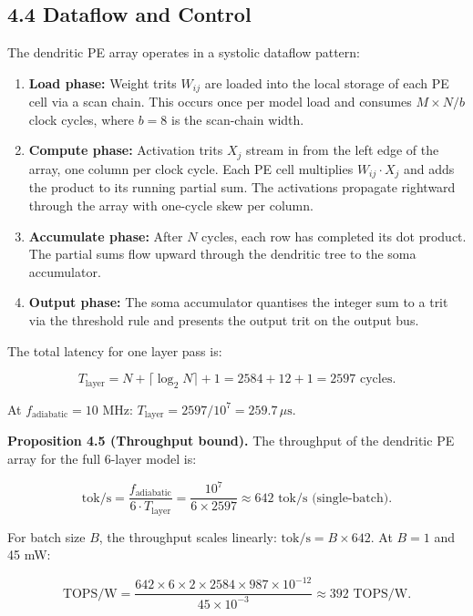 \subsection{4.4 Dataflow and Control}

The dendritic PE array operates in a systolic dataflow pattern:

\begin{enumerate}
\item \textbf{Load phase:} Weight trits \(W_{ij}\) are loaded into
  the local storage of each PE cell via a scan chain. This occurs once
  per model load and consumes \(M \times N / b\) clock cycles, where
  \(b = 8\) is the scan-chain width.
\item \textbf{Compute phase:} Activation trits \(X_j\) stream in from
  the left edge of the array, one column per clock cycle. Each PE cell
  multiplies \(W_{ij} \cdot X_j\) and adds the product to its running
  partial sum. The activations propagate rightward through the array
  with one-cycle skew per column.
\item \textbf{Accumulate phase:} After \(N\) cycles, each row has
  completed its dot product. The partial sums flow upward through the
  dendritic tree to the soma accumulator.
\item \textbf{Output phase:} The soma accumulator quantises the
  integer sum to a trit via the threshold rule and presents the output
  trit on the output bus.
\end{enumerate}

The total latency for one layer pass is:

\[
T_{\text{layer}} = N + \lceil \log_2 N \rceil + 1
= 2584 + 12 + 1 = 2597 \text{ cycles}.
\]

At \(f_{\text{adiabatic}} = 10\) MHz:
\(T_{\text{layer}} = 2597 / 10^7 = 259.7\,\mu\text{s}\).

\textbf{Proposition 4.5 (Throughput bound).} The throughput of the
dendritic PE array for the full 6-layer model is:

\[
\text{tok/s} = \frac{f_{\text{adiabatic}}}{6 \cdot T_{\text{layer}}}
= \frac{10^7}{6 \times 2597}
\approx 642 \text{ tok/s (single-batch)}.
\]

For batch size \(B\), the throughput scales linearly:
\(\text{tok/s} = B \times 642\). At \(B = 1\) and 45 mW:

\[
\text{TOPS/W} = \frac{642 \times 6 \times 2 \times 2584 \times 987
\times 10^{-12}}{45 \times 10^{-3}}
\approx 392 \text{ TOPS/W}.
\]


